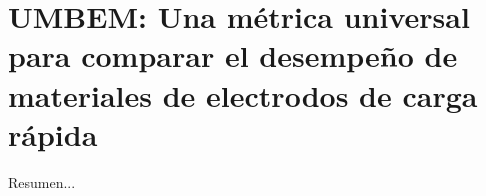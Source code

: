 \chapter{UMBEM: Una métrica universal para comparar el desempeño de materiales de electrodos de carga rápida}\label{ch:umbem}
\thispagestyle{empty}

\vspace{50pt}

\begin{adjustwidth}{50pt}{50pt}
    Resumen...
\end{adjustwidth}

\clearpage
\newpage
\thispagestyle{empty}
\mbox{}
\newpage
